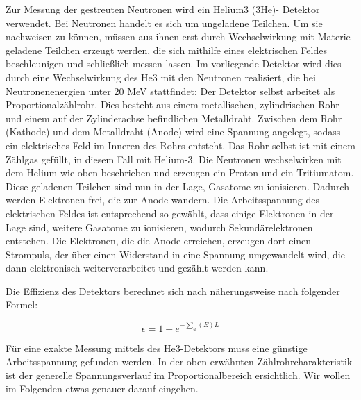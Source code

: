Zur Messung der gestreuten Neutronen wird ein Helium3 (3He)- Detektor verwendet. Bei Neutronen handelt es sich um ungeladene Teilchen. Um sie nachweisen zu können, müssen aus ihnen erst durch Wechselwirkung mit Materie geladene Teilchen erzeugt werden, die sich mithilfe eines elektrischen Feldes beschleunigen und schließlich messen lassen. Im vorliegende Detektor wird dies durch eine Wechselwirkung des He3 mit den Neutronen realisiert, die bei Neutronenenergien unter 20 MeV stattfindet: 
Der Detektor selbst arbeitet als Proportionalzählrohr. Dies besteht aus einem metallischen, zylindrischen Rohr und einem auf der Zylinderachse befindlichen Metalldraht. Zwischen dem Rohr (Kathode) und dem Metalldraht (Anode) wird eine Spannung angelegt, sodass ein elektrisches Feld im Inneren des Rohrs entsteht. Das Rohr selbst ist mit einem Zählgas gefüllt, in diesem Fall mit Helium-3. Die Neutronen wechselwirken mit dem Helium wie oben beschrieben und erzeugen ein Proton und ein Tritiumatom. Diese geladenen Teilchen sind nun in der Lage, Gasatome zu ionisieren. Dadurch werden Elektronen frei, die zur Anode wandern. Die Arbeitsspannung des elektrischen Feldes ist entsprechend so gewählt, dass einige Elektronen in der Lage sind, weitere Gasatome zu ionisieren, wodurch Sekundärelektronen entstehen. Die Elektronen, die die Anode erreichen, erzeugen dort einen Strompuls, der über einen Widerstand in eine Spannung umgewandelt wird, die dann elektronisch weiterverarbeitet und gezählt werden kann. 

Die Effizienz des Detektors berechnet sich nach näherungsweise nach folgender Formel:

\begin{equation}
	\epsilon = 1-e^{-\sum_{a} (E) L}
\end{equation}

Für eine exakte Messung mittels des He3-Detektors muss eine günstige Arbeitsspannung gefunden werden. In der oben erwähnten Zählrohrcharakteristik ist der generelle Spannungsverlauf im Proportionalbereich ersichtlich. Wir wollen im Folgenden etwas genauer darauf eingehen. 








